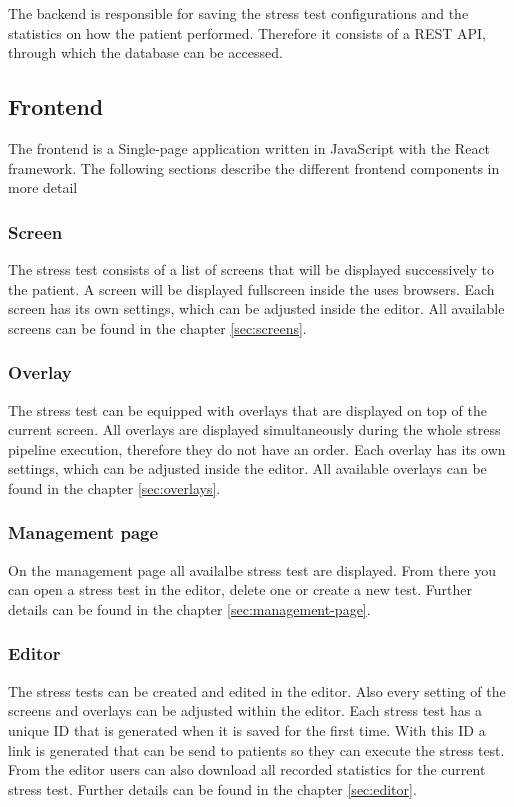 The backend is responsible for saving the stress test configurations and the statistics on how the patient performed.
Therefore it consists of a REST API, through which the database can be accessed.

\subsection{Frontend}
The frontend is a Single-page application written in JavaScript with the React framework. 
The following sections describe the different frontend components in more detail

\subsubsection*{Screen}
The stress test consists of a list of screens that will be displayed successively to the patient. 
A screen will be displayed fullscreen inside the uses browsers. 
Each screen has its own settings, which can be adjusted inside the editor. 
All available screens can be found in the chapter \ref{sec:screens}.

\subsubsection*{Overlay}
The stress test can be equipped with overlays that are displayed on top of the current screen. 
All overlays are displayed simultaneously during the whole stress pipeline execution, therefore they do not have an order. 
Each overlay has its own settings, which can be adjusted inside the editor.
All available overlays can be found in the chapter \ref{sec:overlays}.

\subsubsection*{Management page}
On the management page all availalbe stress test are displayed.
From there you can open a stress test in the editor, delete one or create a new test.
Further details can be found in the chapter \ref{sec:management-page}.

\subsubsection*{Editor}
The stress tests can be created and edited in the editor.
Also every setting of the screens and overlays can be adjusted within the editor.
Each stress test has a unique ID that is generated when it is saved for the first time.
With this ID a link is generated that can be send to patients so they can execute the stress test.
From the editor users can also download all recorded statistics for the current stress test.
Further details can be found in the chapter \ref{sec:editor}.

